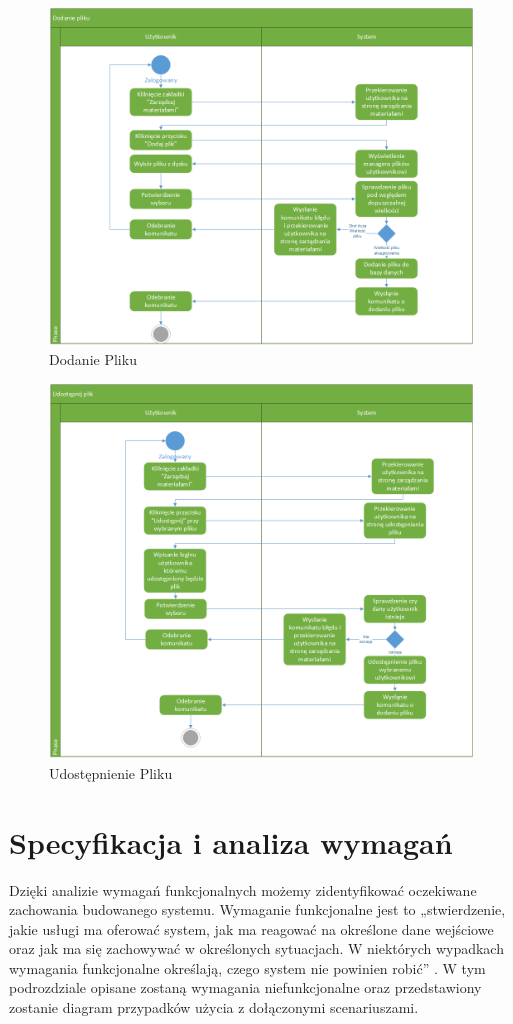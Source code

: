 	\begin{figure}[H]
	\centering
	\includegraphics[scale=0.5]{DodaniePliku}
	\caption{\label{fig:activity_03}Dodanie Pliku}
	\end{figure}
	\begin{figure}[H]
	\centering
	\includegraphics[scale=0.5]{Udostepnienie}
	\caption{\label{fig:activity_04}Udostępnienie Pliku}
	\end{figure}
\section{Specyfikacja i analiza wymagań}
Dzięki analizie wymagań funkcjonalnych możemy zidentyfikować oczekiwane zachowania budowanego systemu. Wymaganie funkcjonalne jest to „stwierdzenie, jakie usługi ma oferować system, jak ma reagować na określone dane wejściowe oraz jak ma się zachowywać w określonych sytuacjach. W niektórych wypadkach wymagania funkcjonalne określają, czego system nie powinien robić” \cite{DOC02}. W tym podrozdziale opisane zostaną wymagania niefunkcjonalne oraz przedstawiony zostanie diagram przypadków użycia z dołączonymi scenariuszami.
